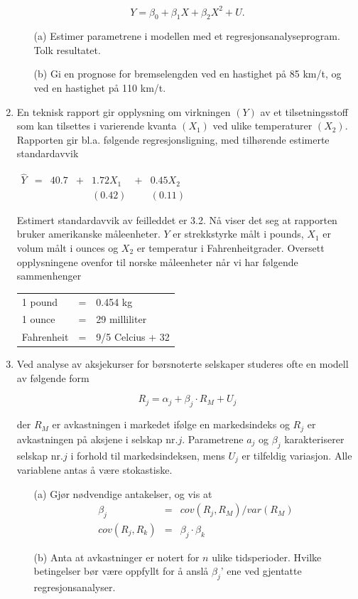 \begin{enumerate}
\[ Y={\beta}_0+ {\beta}_1X+{\beta}_2X^2+U. \] 

\begin{itemize}
\item[(a)] Estimer parametrene i modellen med et regresjonsanalyseprogram.
 Tolk resultatet.  
\item[(b)] Gi en prognose for bremselengden ved en hastighet på 85 km/t,
og ved en hastighet på 110 km/t.
\end{itemize}

\item
En teknisk rapport gir opplysning om virkningen $(Y)$ av et tilsetningsstoff
som kan tilsettes i varierende kvanta $(X_1)$ ved ulike temperaturer $(X_2)$.
Rapporten gir bl.a. følgende regresjonsligning, med tilhørende
estimerte standardavvik

\begin{center}$
\begin{array}{ccccccc}
 \hat{Y}&=&40.7&+&1.72X_1 &+&0.45X_2 \\ 
        & &    & &(0.42)  & &(0.11)
\end{array}$
\end{center}
Estimert standardavvik av feilleddet er 3.2.  Nå viser det seg at 
rapporten bruker amerikanske måleenheter.  $Y$ er strekkstyrke målt
i pounds, $X_1$ er volum målt i ounces og $X_2$ er temperatur i
Fahrenheitgrader.  Oversett opplysningene ovenfor til norske måleenheter
når vi har følgende sammenhenger
\begin{center}
\begin{tabular}{lcl}
1 pound    &  = & 0.454 kg \\
1 ounce    &  = & 29 milliliter \\
Fahrenheit &  = &9/5 Celcius + 32
\end{tabular}
\end{center}
\item
Ved analyse av aksjekurser for børsnoterte selskaper studeres ofte en
modell av følgende form

\[ R_j={\alpha}_j+{\beta}_j\cdot R_M+U_j \]  

\noindent der $R_M$ er avkastningen i markedet ifølge en markedsindeks og
 $R_j$ er avkastningen på aksjene i selskap nr.$j$.  Parametrene $a_j$ og
${\beta}_j$ karakteriserer selskap nr.$j$ i forhold til markedsindeksen,
mens $U_j$ er tilfeldig variasjon.  Alle variablene antas å være
stokastiske.

\begin{itemize}
\item[(a)] Gjør nødvendige antakelser, og vis at
\begin{eqnarray*}
       \beta_j &=&cov(R_j,R_M)/var(R_M) \\
 cov(R_j,R_k)&=&\beta_j \cdot \beta_k
\end{eqnarray*}
\item[(b)] Anta at avkastninger er notert for $n$ ulike tidsperioder.
Hvilke betin\-gelser bør være oppfyllt for å anslå ${\beta}_j$'
ene ved gjentatte regresjonsanalyser.
\end{itemize}


\end{enumerate}
